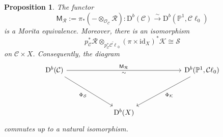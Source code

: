\documentclass[12pt, letterpaper]{amsart}
\newtheorem{proposition}[theorem]{Proposition}
\theoremstyle{definition}
\newcommand{\PP}{\mathbb{P} }
\newcommand{\cC}{\mathcal{C} }
\newcommand{\cK}{\mathcal{K} }
\newcommand{\cO}{\mathcal{O} }
\newcommand{\cR}{\mathcal{R} }
\newcommand{\cS}{\mathcal{S} }
\newcommand{\rD}{\mathrm{D} }
\begin{document}
\begin{proposition}\label{prop:MoritaKuznetsov}
The functor
\[\mathsf M_{\cR}:=\pi_*(-\otimes_{\cO_{\cC}}\cR):\rD^b(\cC)\xrightarrow{\sim}\rD^b(\PP^1,\cC\ell_0)\]
is a Morita equivalence. Moreover, there is an isomorphism
\begin{equation}\label{eqn:Kuznetsov_spinor_comparison}
p_{\cC}^*\cR\otimes_{p_{\cC}^*\widetilde{\cC\ell}_0}(\pi\times\mathrm{id}_X)^*\cK\cong\cS
\end{equation}
on \(\cC\times X\). Consequently, the diagram
\[
\begin{tikzcd}[column sep=6.2em,row sep=4.2em]\rD^b(\cC)\arrow[rr,"\mathsf M_{\cR}","\sim"']\arrow[dr,"\Phi_{\cS}"']&&\rD^b(\PP^1,\cC\ell_0)\arrow[dl,"\Phi_{\cK}"]\\ &\rD^b(X)&\end{tikzcd}
\]
commutes up to a natural isomorphism.
\end{proposition}
\end{document}
